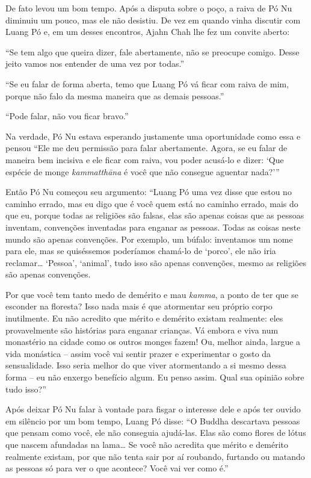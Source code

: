 De fato levou um bom tempo. Após a disputa sobre o poço, a raiva de Pó
Nu diminuiu um pouco, mas ele não desistiu. De vez em quando vinha
discutir com Luang Pó e, em um desses encontros, Ajahn Chah lhe fez um
convite aberto:

``Se tem algo que queira dizer, fale abertamente, não se preocupe
comigo. Desse jeito vamos nos entender de uma vez por todas.''

``Se eu falar de forma aberta, temo que Luang Pó vá ficar com raiva de
mim, porque não falo da mesma maneira que as demais pessoas.''

``Pode falar, não vou ficar bravo.''

Na verdade, Pó Nu estava esperando justamente uma oportunidade como essa
e pensou ``Ele me deu permissão para falar abertamente. Agora, se eu
falar de maneira bem incisiva e ele ficar com raiva, vou poder acusá-lo
e dizer: `Que espécie de monge \emph{kammatthāna} é você que não
consegue aguentar nada?'\thinspace ''

Então Pó Nu começou seu argumento: ``Luang Pó uma vez disse que estou no
caminho errado, mas eu digo que é você quem está no caminho errado, mais
do que eu, porque todas as religiões são falsas, elas são apenas coisas
que as pessoas inventam, convenções inventadas para enganar as pessoas.
Todas as coisas neste mundo são apenas convenções. Por exemplo, um
búfalo: inventamos um nome para ele, mas se quiséssemos poderíamos
chamá-lo de `porco', ele não iria reclamar\ldots{} `Pessoa', `animal',
tudo isso são apenas convenções, mesmo as religiões são apenas
convenções.

Por que você tem tanto medo de demérito e mau \emph{kamma}, a ponto de
ter que se esconder na floresta? Isso nada mais é que atormentar seu
próprio corpo inutilmente. Eu não acredito que mérito e demérito existam
realmente: eles provavelmente são histórias para enganar crianças. Vá
embora e viva num monastério na cidade como os outros monges fazem! Ou,
melhor ainda, largue a vida monástica -- assim você vai sentir prazer e
experimentar o gosto da sensualidade. Isso seria melhor do que viver
atormentando a si mesmo dessa forma -- eu não enxergo benefício algum.
Eu penso assim. Qual sua opinião sobre tudo isso?''

Após deixar Pó Nu falar à vontade para fisgar o interesse dele e após
ter ouvido em silêncio por um bom tempo, Luang Pó disse: ``O Buddha
descartava pessoas que pensam como você, ele não conseguia ajudá-las.
Elas são como flores de lótus que nascem afundadas na lama\ldots{} Se
você não acredita que mérito e demérito realmente existam, por que não
tenta sair por aí roubando, furtando ou matando as pessoas só para ver o
que acontece? Você vai ver como é.''

